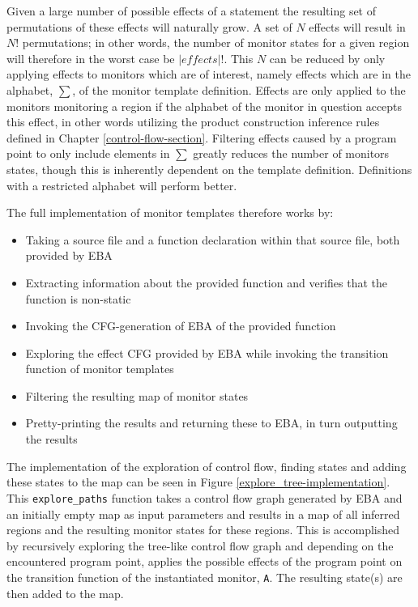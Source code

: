 \newpar Given a large number of possible effects of a statement the resulting set of permutations of these effects will naturally grow. A set of $N$ effects will result in $N!$ permutations; in other words, the number of monitor states for a given region will therefore in the worst case be $|\mathit{effects}|!$. This $N$ can be reduced by only applying effects to monitors which are of interest, namely effects which are in the alphabet, $\sum$, of the monitor template definition. Effects are only applied to the monitors monitoring a region if the alphabet of the monitor in question accepts this effect, in other words utilizing the product construction inference rules defined in Chapter \ref{control-flow-section}.  Filtering effects caused by a program point to only include elements in $\sum$ greatly reduces the number of monitors states, though this is inherently dependent on the template definition. Definitions with a restricted alphabet will perform better. 

\newpar The full implementation of monitor templates therefore works by:

\begin{itemize}
    \item Taking a source file and a function declaration within that source file, both provided by EBA
    \item Extracting information about the provided function and verifies that the function is non-static
    \item Invoking the CFG-generation of EBA of the provided function
    \item Exploring the effect CFG provided by EBA while invoking the transition function of monitor templates
    \item Filtering the resulting map of monitor states
    \item Pretty-printing the results and returning these to EBA, in turn outputting the results 
\end{itemize}

\newpar The implementation of the exploration of control flow, finding states and adding these states to the map can be seen in Figure \ref{explore_tree-implementation}. This \texttt{explore\_paths} function takes a control flow graph generated by EBA and an initially empty map as input parameters and results in a map of all inferred regions and the resulting monitor states for these regions. This is accomplished by recursively exploring the tree-like control flow graph and depending on the encountered program point, applies the possible effects of the program point on the transition function of the instantiated monitor, \texttt{A}. The resulting state(s) are then added to the map. 

